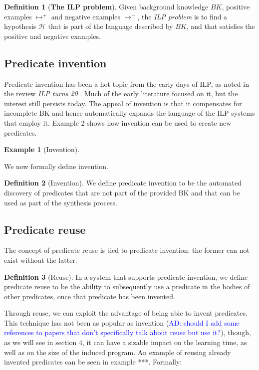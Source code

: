 \documentclass{article}
\newcommand{\ad}[1]{\textcolor{blue}{AD: #1}}
\newtheorem{example}{Example}
\theoremstyle{definition}
\newtheorem{defn}{Definition}[section]
\begin{document}
\begin{defn}[\textbf{The ILP problem}]
Given background knowledge $BK$, positive examples $\mapsto^+$ and negative examples $\mapsto^-$, the \emph{ILP problem} is to find a hypothesis $\mathcal{H}$ that is part of the language described by $BK$, and that satisfies the positive and negative examples.  
\end{defn}

\subsection{Predicate invention}
Predicate invention has been a hot topic from the early days of ILP, as noted in the review \textit{ILP turns 20} \cite{ilpturns20}. Much of the early literature focused on it, but the interest still persists today. The appeal of invention is that it compensates for incomplete BK and hence automatically expands the language of the ILP systems that employ it. Example 2 shows how invention can be used to create new predicates.

\begin{example}[Invention]

\end{example}

We now formally define invention.
\begin{defn}[Invention]
We define predicate invention to be the automated discovery of predicates that are not part of the provided BK and that can be used as part of the synthesis process.
\end{defn}
 
\subsection{Predicate reuse}
The concept of predicate reuse is tied to predicate invention: the former can not exist without the latter.

\begin{defn}[Reuse]
In a system that supports predicate invention, we define predicate reuse to be the ability to subsequently use a predicate in the bodies of other predicates, once that predicate has been invented.
\end{defn}

Through reuse, we can exploit the advantage of being able to invent predicates. This technique has not been as popular as invention (\ad{should I add some references to papers that don't specifically talk about reuse but use it?}), though, as we will see in section 4, it can have a sizable impact on the learning time, as well as on the size of the induced program. An example of reusing already invented predicates can be seen in example ***. Formally:
\end{document}
